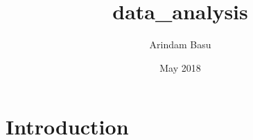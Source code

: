 \documentclass{article}
\title{data_analysis}
\author{Arindam Basu}
\date{May 2018}
\begin{document}
\maketitle

\section{Introduction}
\end{document}
